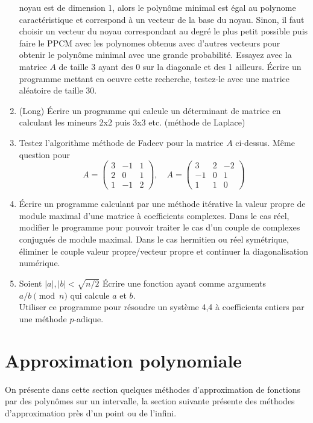 \documentclass[a4paper,11pt]{book}
\begin{document}
\begin{giacjshere}
\begin{enumerate}
noyau est de dimension 1, alors le polynôme minimal est égal au
polynome caractéristique et correspond à un vecteur de la base du noyau.
Sinon, il faut choisir un vecteur du noyau correspondant au degré
le plus petit possible puis faire le PPCM avec les polynomes obtenus
avec d'autres vecteurs pour obtenir le polynôme minimal avec une grande
probabilité.
Essayez avec la matrice $A$ de taille 3 ayant des 0 sur la diagonale et 
des 1 ailleurs.
\'Ecrire un programme mettant en oeuvre cette recherche, testez-le avec
une matrice al\'eatoire de taille 30.
\item (Long) \'Ecrire un programme qui calcule un d\'eterminant de matrice
en calculant les mineurs 2x2 puis 3x3 etc. (m\'ethode de Laplace)
\item Testez l'algorithme méthode de Fadeev pour la matrice $A$ ci-dessus.
Même question pour 
\[ A=\left(\begin{array}{ccc}
 3 & -1 & 1 \\
2 &0 &1 \\
1 & -1 & 2 
\end{array}\right), \quad 
A=\left(\begin{array}{ccc}
 3 & 2 & -2 \\
-1 &0 &1 \\
1 & 1 & 0 
\end{array}\right) 
 \]
\item \'Ecrire un programme calculant par une méthode itérative
la valeur propre de module maximal d'une matrice à coefficients
complexes. Dans le cas réel, modifier le programme pour pouvoir
traiter le cas d'un couple de complexes conjugués de module maximal.
Dans le cas hermitien ou réel symétrique, éliminer le couple valeur
propre/vecteur propre et continuer la diagonalisation numérique.
\item Soient $|a|,|b|<\sqrt{n/2}$
\'Ecrire une fonction ayant comme arguments $a/b \pmod n$ 
qui calcule $a$ et $b$.\\
Utiliser ce programme pour résoudre un système 4,4 à coefficients entiers
par une méthode $p$-adique.
\end{enumerate}

\pagebreak


\chapter{Approximation polynomiale} \label{sec:interp}
On présente dans cette section quelques méthodes d'approximation
de fonctions par des polynômes sur un intervalle, la section suivante 
présente des méthodes d'approximation près d'un point ou de l'infini.


\end{giacjshere}
\end{document}
